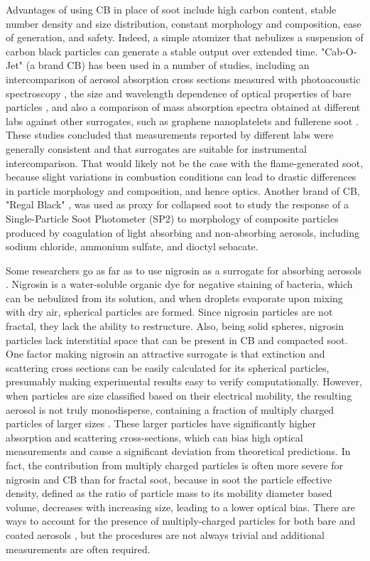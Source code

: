 \documentclass[12pt,authoryear]{elsarticle}
\begin{document}
Advantages of using CB in place of soot include high carbon content, stable number density and size distribution, constant morphology and composition, ease of generation, and safety. Indeed, a simple atomizer that nebulizes a suspension of carbon black particles can generate a stable output over extended time. "Cab-O-Jet" (a brand CB) has been used in a number of studies, including an intercomparison of aerosol absorption cross sections measured with photoacoustic spectroscopy \citep{RN3}, the size and wavelength dependence of optical properties of bare particles \citep{RN4}, and also a comparison of mass absorption spectra obtained at different labs against other surrogates, such as graphene nanoplatelets and fullerene soot \citep{RN63}. These studies concluded that measurements reported by different labs were generally consistent and that surrogates are suitable for instrumental intercomparison. That would likely not be the case with the flame-generated soot, because slight variations in combustion conditions can lead to drastic differences in particle morphology and composition, and hence optics. Another brand of CB, "Regal Black" \citep{RN65}, was used as proxy for collapsed soot to study the response of a Single-Particle Soot Photometer (SP2) to morphology of composite particles produced by coagulation of light absorbing and non-absorbing aerosols, including sodium chloride, ammonium sulfate, and dioctyl sebacate. 

Some researchers go as far as to use nigrosin as a surrogate for absorbing aerosols \citep{RN8,RN54,RN55,RN56,RN57,drinovec2022dual}. Nigrosin is a water-soluble organic dye for negative staining of bacteria, which can be nebulized from its solution, and when droplets evaporate upon mixing with dry air, spherical particles are formed. Since nigrosin particles are not fractal, they lack the ability to restructure. Also, being solid spheres, nigrosin particles lack interstitial space that can be present in CB and compacted soot. One factor making nigrosin an attractive surrogate is that extinction and scattering cross sections can be easily calculated for its spherical particles, presumably making experimental results easy to verify computationally. However, when particles are size classified based on their electrical mobility, the resulting aerosol is not truly monodisperse, containing a fraction of multiply charged particles of larger sizes \citep{mcmurry2002relationship,pagels2009processing}. These larger particles have significantly higher absorption and scattering cross-sections, which can bias high optical measurements \citep{RN50} and cause a significant deviation from theoretical predictions. In fact, the contribution from multiply charged particles is often more severe for nigrosin and CB than for fractal soot, because in soot the particle effective density, defined as the ratio of particle mass to its mobility diameter based volume, decreases with increasing size, leading to a lower optical bias. There are ways to account for the presence of multiply-charged particles for both bare and coated aerosols \citep{RN67, RN77}, but the procedures are not always trivial and additional measurements are often required. 
\end{document}
